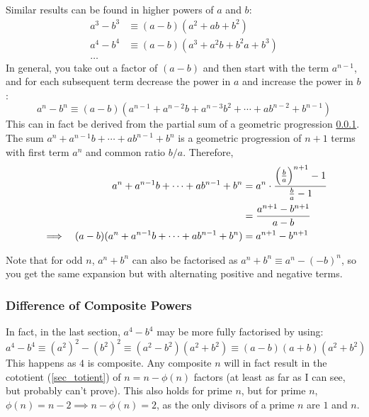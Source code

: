 \documentclass[fleqn,a4paper,11pt]{article}
\begin{document}
    Similar results can be found in higher powers of \(a\) and \(b\):
    \begin{align*}
    a^3 - b^3 &\equiv (a - b)(a^2 + ab + b^2) \\
    a^4 - b^4 &\equiv (a - b)(a^3 + a^2b + b^2a + b^3) \\
    \dots
    \end{align*}
    In general, you take out a factor of \((a - b)\) and then start with the
    term \(a^{n - 1}\), and for each subsequent term decrease the power in \(a\)
    and increase the power in \(b\):
    \begin{equation}
    a^n - b^n \equiv (a - b)(a^{n - 1} + a^{n - 2}b + a^{n - 3}b^2 + \dotsb +
                             ab^{n - 2} + b^{n - 1})
    \end{equation}
    This can in fact be derived from the partial sum of a geometric progression
    \ref{}. The sum \(a^n + a^{n - 1}b + \dotsb + ab^{n - 1} + b^n\) is
    a geometric progression of \(n + 1\) terms with first term \(a^n\) and
    common ratio \(b/a\).  Therefore,
    \begin{alignat*}{2}
    &&a^n + a^{n - 1}b + \dotsb + ab^{n - 1} + b^n &=
            a^n \cdot \frac{\pqty{\frac ba}^{n + 1} - 1}{\frac ba - 1} \\
    &&    &= \frac{a^{n + 1} - b^{n + 1}}{a - b} \\
    &\implies& (a - b)(a^n + a^{n - 1}b + \dotsb + ab^{n - 1} + b^n) &=
            a^{n + 1} - b^{n + 1}
    \end{alignat*}

    Note that for odd \(n\), \(a^n + b^n\) can also be factorised as
    \(a^n + b^n \equiv a^n - (-b)^n\), so you get the same expansion but with
    alternating positive and negative terms.


    \subsubsection{Difference of Composite Powers}

    In fact, in the last section, \(a^4 - b^4\) may be more fully factorised by
    using:
    \begin{equation*}
    a^4 - b^4 \equiv (a^2)^2 - (b^2)^2 \equiv (a^2 - b^2)(a^2 + b^2) \equiv
        (a - b)(a + b)(a^2 + b^2)
    \end{equation*}
    This happens as \(4\) is composite. Any composite \(n\) will in fact result
    in the cototient (\ref{sec_totient}) of \(n = n - \phi(n)\) factors (at
    least as far as I can see, but probably can't prove). This
    also holds for prime \(n\), but for prime \(n\),
    \(\phi(n) = n - 2 \implies n - \phi(n) = 2\), as the only divisors of
    a prime \(n\) are \(1\) and \(n\).
\end{document}
